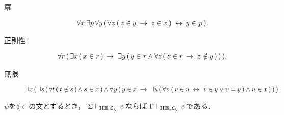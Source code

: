 \begin{description}
		\item[冪] 
			\begin{align}
				\forall x\, \exists p\, \forall y\, 
				(\, \forall z\, (\, z \in y \hspace{0.25em}\rightarrow\hspace{0.25em} z \in x\, ) \hspace{0.25em}\leftrightarrow\hspace{0.25em} y \in p\, ).
			\end{align}
			
		\item[正則性] 
			\begin{align}
				\forall r\, (\, \exists x\, (\, x \in r\, ) \hspace{0.25em}\rightarrow\hspace{0.25em}
				\exists y\, (\, y \in r \wedge \forall z\, (\, z \in r \hspace{0.25em}\rightarrow\hspace{0.25em}
				z \notin y\, )\, )\, ).
			\end{align}
			
		\item[無限] 
			\begin{align}
				\exists x\, (\, 
				\exists s\, (\, \forall t\, (\, t \notin s\, ) \wedge s \in x\, ) 
				\wedge \forall y\, (\, 
				y \in x \hspace{0.25em}\rightarrow\hspace{0.25em} \exists u\, (\, 
				\forall v\, (\, v \in u \hspace{0.25em}\leftrightarrow\hspace{0.25em} v \in y \vee v = y\, )
				\wedge u \in x\, )\, )\, ).
			\end{align}
	\end{description}
	
	
	\begin{screen}
		\begin{metathm}
		\label{metathm:Henkin_expansion_3}
			$\psi$を$\lang{\in}$の文とするとき，
			$\Sigma \provable{\mbox{{\bf HE}},\lang{\varepsilon}} \psi$ならば
			$\Gamma \provable{\mbox{{\bf HE}},\lang{\varepsilon}} \psi$である．
		\end{metathm}
	\end{screen}
	
